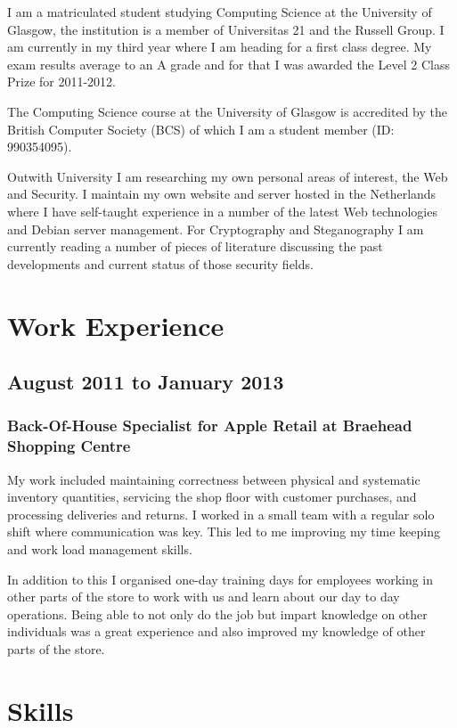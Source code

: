 \documentclass[11pt,a4paper]{article}
\begin{document}
I am a matriculated student studying Computing Science at the University of
Glasgow, the institution is a member of Universitas 21 and the Russell Group.
I am currently in my third year where I am heading for a first class degree.
My exam results average to an A grade and for that I was awarded the Level 2
Class Prize for 2011-2012.

The Computing Science course at the University of Glasgow is accredited by the
British Computer Society (BCS) of which I am a student member (ID: 990354095).

Outwith University I am researching my own personal areas of interest, the
Web and Security. I maintain my own website and server hosted in the
Netherlands where I have self-taught experience in a number of the latest Web
technologies and Debian server management. For Cryptography and Steganography
I am currently reading a number of pieces of literature discussing the past
developments and current status of those security fields.

\section*{Work Experience}

\subsection*{August 2011 to January 2013}

\subsubsection*{Back-Of-House Specialist for Apple Retail at Braehead
Shopping Centre}

My work included maintaining correctness between physical and systematic
inventory quantities, servicing the shop floor with customer purchases, and
processing deliveries and returns. I worked in a small team with a regular
solo shift where communication was key. This led to me improving my time
keeping and work load management skills.

In addition to this I organised one-day training days for employees working in
other parts of the store to work with us and learn about our day to day
operations. Being able to not only do the job but impart knowledge on other
individuals was a great experience and also improved my knowledge of other
parts of the store.

\section*{Skills}
\end{document}
